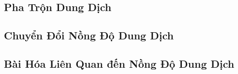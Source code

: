 \documentclass{article}
\numberwithin{equation}{section}
\begin{document}
\subsection{Pha Trộn Dung Dịch}


\subsection{Chuyển Đổi Nồng Độ Dung Dịch}


\subsection{Bài Hóa Liên Quan đến Nồng Độ Dung Dịch}


\printbibliography[heading=bibintoc]
	
\end{document}
